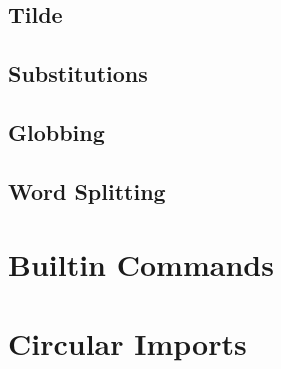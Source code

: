 \subsection{Tilde}
\subsection{Substitutions}
\subsection{Globbing}
\subsection{Word Splitting}

\section{Builtin Commands}

\section{Circular Imports}




